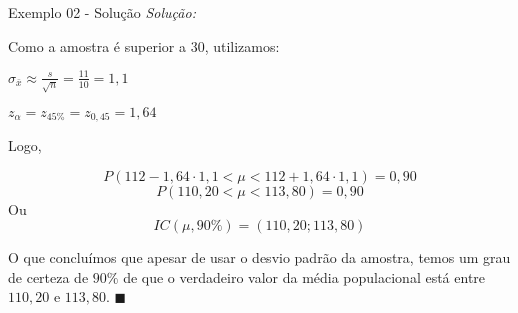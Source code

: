 \documentclass[hyperref={pdfpagelabels=false}]{beamer}
\begin{document}
\begin{frame}{Exemplo 02 - Solução}
\textit{Solução:} 

Como a amostra é superior a $30$, utilizamos: \pause

$\sigma_{\bar{x}} \approx \displaystyle \frac{s}{\sqrt{n}} = \frac{11}{10} = 1,1$ \pause

$z_\alpha = z_{45\%} = z_{0,45} = 1,64$ \pause

Logo, \pause

$$P(112 - 1,64 \cdot 1,1 < \mu < 112 + 1,64 \cdot 1,1) = 0,90$$
$$P(110,20<\mu<113,80) = 0,90$$ \pause
Ou \pause
$$IC(\mu,90\%) = (110,20;113,80)$$ \pause

O que concluímos que apesar de usar o desvio padrão da amostra, temos um grau de certeza de $90\%$ de que o verdadeiro valor da média populacional está entre $110,20$ e $113,80$.	$\blacksquare$

\end{frame}
\end{document}
